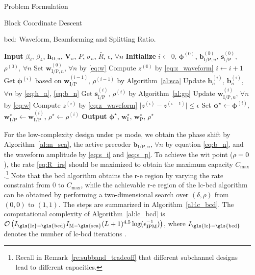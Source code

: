 \begin{section}{Problem Formulation}
\begin{subsection}{Block Coordinate Descent}
		\begin{algorithm}[!t]
			\caption{\gls{bcd}: Waveform, Beamforming and Splitting Ratio.}
			\label{al:bcd}
			\begin{algorithmic}[1]
				\State \textbf{Input} $\beta_2$, $\beta_4$, $\boldsymbol{h}_{\mathrm{D},n}$, $\boldsymbol{V}_{n}$, $P$, $\sigma_n$, $\bar{R}$, $\epsilon$, $\forall n$
				\State \textbf{Initialize} $i \gets 0$, $\boldsymbol{\phi}^{(0)}$, $\boldsymbol{b}_{\mathrm{I/P},n}^{(0)}$, $\boldsymbol{s}_{\mathrm{I/P}}^{(0)}$, $\rho^{(0)}$, $\forall n$
				\State Set $\boldsymbol{w}_{\mathrm{I/P},n}^{(0)}$, $\forall n$ by \eqref{eq:w}
				\State Compute $z^{(0)}$ by \eqref{eq:z_waveform}
				\Repeat
					\State $i \gets i + 1$
					\State Get $\boldsymbol{\phi}^{(i)}$ based on $\boldsymbol{w}_{\mathrm{I/P}}^{(i-1)}$, $\rho^{(i-1)}$ by Algorithm~\ref{al:sca}
					\State Update $\boldsymbol{h}_n^{(i)}$, $\boldsymbol{b}_n^{(i)}$, $\forall n$ by \eqref{eq:h_n}, \eqref{eq:b_n}
					\State Get $\boldsymbol{s}_{\mathrm{I/P}}^{(i)}$, $\rho^{(i)}$ by Algorithm~\ref{al:gp}
					\State Update $\boldsymbol{w}_{\mathrm{I/P},n}^{(i)}$, $\forall n$ by \eqref{eq:w}
					\State Compute $z^{(i)}$ by \eqref{eq:z_waveform}
				\Until $\lvert z^{(i)} - z^{(i-1)} \rvert \le \epsilon$
				\State Set $\boldsymbol{\phi}^{\star} \gets \boldsymbol{\phi}^{(i)}$, $\boldsymbol{w}_{\mathrm{I/P}}^{\star} \gets \boldsymbol{w}_{\mathrm{I/P}}^{(i)}$, $\rho^{\star} \gets \rho^{(i)}$
				\State \textbf{Output} $\boldsymbol{\phi}^{\star}$, $\boldsymbol{w}_{\mathrm{I}}^{\star}$, $\boldsymbol{w}_{\mathrm{P}}^{\star}$, $\rho^{\star}$
			\end{algorithmic}
		\end{algorithm}

		For the low-complexity design under \gls{ps} mode, we obtain the phase shift by Algorithm~\ref{al:m_sca}, the active precoder $\boldsymbol{b}_{\mathrm{I/P},n}$, $\forall n$ by equation \eqref{eq:b_n}, and the waveform amplitude by \eqref{eq:s_i} and \eqref{eq:s_p}. To achieve the \gls{wit} point ($\rho=0$), the rate \eqref{eq:R_irs} should be maximized to obtain the maximum capacity $C_{\max}$.\footnote{Recall in Remark~\ref{re:subband_tradeoff} that different subchannel designs lead to different capacities.} Note that the \gls{bcd} algorithm obtains the \gls{r-e} region by varying the rate constraint from \num{0} to $C_{\max}$, while the achievable \gls{r-e} region of the \gls{lc}-\gls{bcd} algorithm can be obtained by performing a two-dimensional search over $(\delta, \rho)$ from $(0, 0)$ to $(1, 1)$. The steps are summarized in Algorithm~\ref{al:lc_bcd}. The computational complexity of Algorithm~\ref{al:lc_bcd} is $\mathcal{O}\left(I_{\mathrm{\gls{lc}-\gls{bcd}}}I_{\mathrm{M-\gls{sca}}}(L+1)^{4.5} \log(\epsilon_{\mathrm{IPM}}^{-1})\right)$, where $I_{\mathrm{\gls{lc}-\gls{bcd}}}$ denotes the number of \gls{lc}-\gls{bcd} iterations \cite{Luo2010b}.


\end{subsection}
\end{section}
